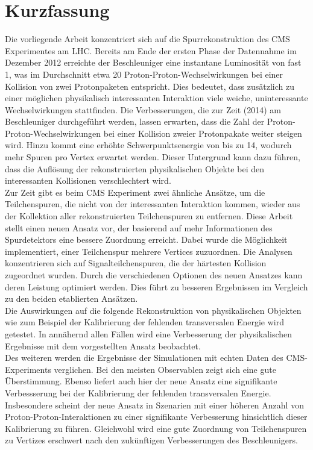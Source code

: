 
\chapter*{Kurzfassung}

Die vorliegende Arbeit konzentriert sich auf die Spurrekonstruktion des CMS Experimentes am LHC. Bereits am Ende der ersten Phase der Datennahme im Dezember 2012 erreichte der Beschleuniger eine instantane Luminosit\"a{}t von fast 1\percms{}, was im Durchschnitt etwa 20 Proton-Proton-Wechselwirkungen bei einer Kollision von zwei Protonpaketen entspricht. Dies bedeutet, dass zus\"a{}tzlich zu einer m\"o{}glichen physikalisch interessanten Interaktion viele weiche, uninteressante Wechselwirkungen stattfinden. Die Verbesserungen, die zur Zeit (2014) am Beschleuniger durchgef\"u{}hrt werden, lassen erwarten, dass die Zahl der Proton-Proton-Wechselwirkungen bei einer Kollision zweier Protonpakate weiter steigen wird. Hinzu kommt eine erh\"o{}hte Schwerpunktsenergie von bis zu 14\TeV{}, wodurch mehr Spuren pro Vertex erwartet werden. Dieser Untergrund kann dazu f\"u{}hren, dass die Aufl\"o{}sung der rekonstruierten physikalischen Objekte bei den interessanten Kollisionen verschlechtert wird. \\
Zur Zeit gibt es beim CMS Experiment zwei \"a{}hnliche Ans\"a{}tze, um die Teilchenspuren, die nicht von der interessanten Interaktion kommen, wieder aus der Kollektion aller rekonstruierten Teilchenspuren zu entfernen. Diese Arbeit stellt einen neuen Ansatz vor, der basierend auf mehr Informationen des Spurdetektors eine bessere Zuordnung erreicht. Dabei wurde die M\"o{}glichkeit implementiert, einer Teilchenspur mehrere Vertices zuzuordnen. Die Analysen konzentrieren sich auf Signalteilchenspuren, die der h\"a{}rtesten Kollision zugeordnet wurden. Durch die verschiedenen Optionen des neuen Ansatzes kann deren Leistung optimiert werden. Dies f\"u{}hrt zu besseren Ergebnissen im Vergleich zu den beiden etablierten Ans\"a{}tzen. \\
Die Auswirkungen auf die folgende Rekonstruktion von physikalischen Objekten wie zum Beispiel der Kalibrierung der fehlenden transversalen Energie wird getestet. In ann\"a{}hernd allen F\"a{}llen wird eine Verbesserung der physikalischen Ergebnisse mit dem vorgestellten Ansatz beobachtet. \\
Des weiteren werden die Ergebnisse der Simulationen mit echten Daten des CMS-Experiments verglichen. Bei den meisten Observablen zeigt sich eine gute \"U{}berstimmung. Ebenso liefert auch hier der neue Ansatz eine signifikante Verbessserung bei der Kalibrierung der fehlenden transversalen Energie. Insbesondere scheint der neue Ansatz in Szenarien mit einer h\"o{}heren Anzahl von Proton-Proton-Interaktionen zu einer signifikante Verbesserung hinsichtlich dieser Kalibrierung zu f\"u{}hren. Gleichwohl wird eine gute Zuordnung von Teilchenspuren zu Vertizes erschwert nach den zuk\"u{}nftigen Verbesserungen des Beschleunigers.

